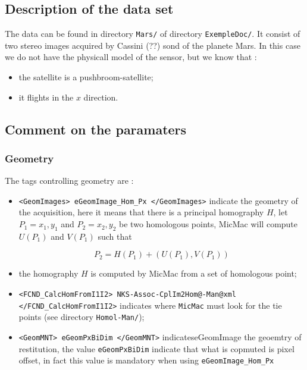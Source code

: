 \subsection{Description of the data set}

The data can be found in directory {\tt Mars/} of directory {\tt ExempleDoc/}.
It consist of two stereo images acquired by Cassini (??) sond of the planete Mars. In this case
we do not have the physicall model of the sensor, but we know that :

\begin{itemize}
   \item the satellite is a  pushbroom-satellite;
   \item it flights in the $x$ direction.
\end{itemize}

\subsection{Comment on the paramaters}

\subsubsection{Geometry}

The tags controlling geometry are :

\begin{itemize}

   \item   {\tt <GeomImages> eGeomImage\_Hom\_Px </GeomImages>} indicate the geometry of the acquisition,
          here it means that there is a principal homography $H$, let $P_1=x_1,y_1$ and  $P_2=x_2,y_2$ be two
          homologous points, MicMac will compute $U(P_1)$ and $V(P_1)$ such that

\begin{equation}
    P_2 = H(P_1) + (U(P_1),V(P_1))
\end{equation}

   \item  the homography $H$ is computed by MicMac from a set of homologous point;

   \item  {\tt  <FCND\_CalcHomFromI1I2> NKS-Assoc-CplIm2Hom@-Man@xml  </FCND\_CalcHomFromI1I2>}  indicates
          where {\tt MicMac} must look for the tie points (see directory {\tt Homol-Man/});


   \item  {\tt <GeomMNT> eGeomPxBiDim  </GeomMNT>} indicateseGeomImage the geoemtry of restitution,
          the value {\tt eGeomPxBiDim} indicate that what is copmuted is pixel offset, in fact this value
          is mandatory when using {\tt eGeomImage\_Hom\_Px}


\end{itemize}

